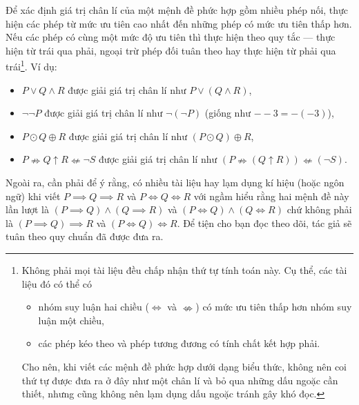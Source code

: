 Để xác định giá trị chân lí của một mệnh đề phức hợp gồm nhiều phép nối, thực hiện các phép từ mức ưu tiên cao nhất đến những phép có mức ưu tiên thấp hơn. Nếu các phép có cùng một mức độ ưu tiên thì thực hiện theo quy tắc  --- thực hiện từ trái qua phải, ngoại trừ phép đối tuân theo  hay thực hiện từ phải qua trái\footnote{Không phải mọi tài liệu đều chấp nhận thứ tự tính toán này. Cụ thể, các tài liệu đó có thể có
\begin{itemize}
   \item nhóm suy luận hai chiều ($\iff$ và $\nLeftrightarrow$) có mức ưu tiên thấp hơn nhóm suy luận một chiều,
   \item các phép kéo theo và phép tương đương có tính chất kết hợp phải.
\end{itemize} Cho nên, khi viết các mệnh đề phức hợp dưới dạng biểu thức, không nên coi thứ tự được đưa ra ở đây như một chân lí và bỏ qua những dấu ngoặc cần thiết, nhưng cũng không nên lạm dụng dấu ngoặc tránh gây khó đọc.}. Ví dụ:
\begin{itemize}
   \item $P \lor Q \land R$ được giải giá trị chân lí như $P \lor (Q \land R)$,
   \item $\neg \neg P$ được giải giá trị chân lí như $\neg (\neg P)$ (giống như $--3 = -(-3)$),
   \item $P\odot Q \oplus R$ được giải giá trị chân lí như $(P \odot Q) \oplus R$,
   \item $P \nRightarrow Q \uparrow R \nLeftarrow \neg S$ được giải giá trị chân lí như $(P \nRightarrow (Q \uparrow R)) \nLeftarrow (\neg S)$.
\end{itemize}

Ngoài ra, cần phải để ý rằng, có nhiều tài liệu hay lạm dụng kí hiệu (hoặc ngôn ngữ) khi viết $P \implies Q \implies R$ và $P \iff Q \iff R$ với ngầm hiểu rằng hai mệnh đề này lần lượt là $(P \implies Q) \land (Q \implies R)$ và $(P \iff Q) \land (Q \iff R)$ chứ không phải là $(P \implies Q) \implies R$ và $(P \iff Q) \iff R$. Để tiện cho bạn đọc theo dõi, tác giả sẽ tuân theo quy chuẩn đã được đưa ra.

